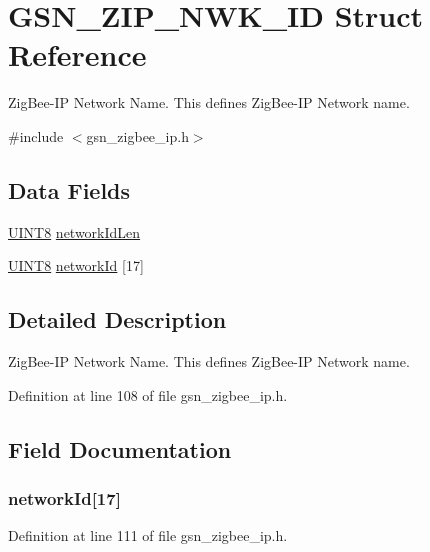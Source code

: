 \hypertarget{a00441}{
\section{GSN\_\-ZIP\_\-NWK\_\-ID Struct Reference}
\label{a00441}
}


ZigBee-\/IP Network Name. This defines ZigBee-\/IP Network name.  




{\ttfamily \#include $<$gsn\_\-zigbee\_\-ip.h$>$}

\subsection*{Data Fields}
\begin{DoxyCompactItemize}
\item 
\hyperlink{a00660_gab27e9918b538ce9d8ca692479b375b6a}{UINT8} \hyperlink{a00441_a0995f4868656e4dd69ae4d9ceafc3ea5}{networkIdLen}
\item 
\hyperlink{a00660_gab27e9918b538ce9d8ca692479b375b6a}{UINT8} \hyperlink{a00441_ac8eee3499baf1f7412c2a1a1ad11b544}{networkId} \mbox{[}17\mbox{]}
\end{DoxyCompactItemize}


\subsection{Detailed Description}
ZigBee-\/IP Network Name. This defines ZigBee-\/IP Network name. 

Definition at line 108 of file gsn\_\-zigbee\_\-ip.h.



\subsection{Field Documentation}
\hypertarget{a00441_ac8eee3499baf1f7412c2a1a1ad11b544}{
\subsubsection[{networkId}]{ {\bf networkId}\mbox{[}17\mbox{]}}}
\label{a00441_ac8eee3499baf1f7412c2a1a1ad11b544}


Definition at line 111 of file gsn\_\-zigbee\_\-ip.h.

